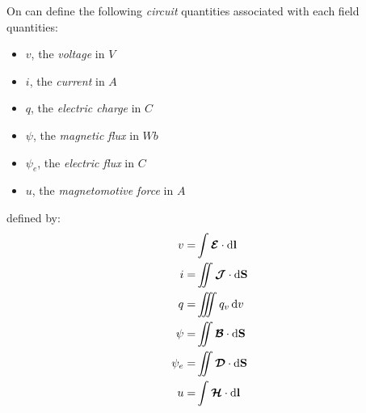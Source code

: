On can define the following \emph{circuit} quantities associated with each field quantities\parencite{Harrington2001}:
\begin{itemize}
	\item $v$, the \emph{voltage} in $V$
	\item $i$, the \emph{current} in $A$
	\item $q$, the \emph{electric charge} in $C$
	\item $\psi$, the \emph{magnetic flux} in $Wb$
	\item $\psi_e$, the \emph{electric flux} in $C$
	\item $u$, the \emph{magnetomotive force} in $A$
\end{itemize}
defined by:
\begin{subequations}
	\begin{align}
	v =& \int \boldsymbol{\mathcal{E}} \cdot \mathop{}\!\mathrm{d} \mathbf{l} \\
	i =& \iint \boldsymbol{\mathcal{J}} \cdot \mathop{}\!\mathrm{d} \mathbf{S} \\
	q =& \iiint q_v \mathop{}\!\mathrm{d} v \\
	\psi =& \iint \boldsymbol{\mathcal{B}} \cdot \mathop{}\!\mathrm{d} \mathbf{S} \\
	\psi_e=& \iint \boldsymbol{\mathcal{D}} \cdot \mathop{}\!\mathrm{d} \mathbf{S} \\
	u =& \int \boldsymbol{\mathcal{H}} \cdot \mathop{}\!\mathrm{d} \mathbf{l}
	\end{align}
	\label{eq:CircuitQuantities}
\end{subequations}



